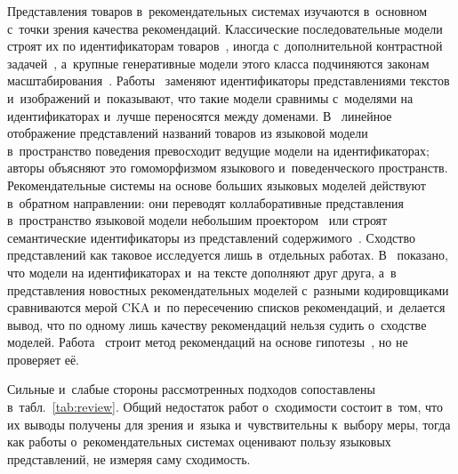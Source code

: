 \documentclass[a4paper,12pt]{article}
\begin{document}
Представления товаров в~рекомендательных системах изучаются в~основном с~точки зрения
качества рекомендаций. Классические последовательные модели строят их по идентификаторам
товаров~\cite{kang2018sasrec,sun2019bert4rec}, иногда с~дополнительной контрастной
задачей~\cite{xie2022cl4srec}, а~крупные генеративные модели этого класса подчиняются
законам масштабирования~\cite{zhai2024hstu}. Работы~\cite{hou2022unisrec,li2023recformer,yuan2023idvsmodality}
заменяют идентификаторы представлениями текстов и~изображений и~показывают, что такие
модели сравнимы с~моделями на идентификаторах и~лучше переносятся между доменами.
В~\cite{sheng2025alpharec} линейное отображение представлений названий товаров
из языковой модели в~пространство поведения превосходит ведущие модели
на идентификаторах; авторы объясняют это гомоморфизмом языкового и~поведенческого
пространств. Рекомендательные системы на основе больших языковых моделей действуют
в~обратном направлении: они переводят коллаборативные представления в~пространство
языковой модели небольшим проектором~\cite{zhang2023collm,liao2024llara} или строят
семантические идентификаторы из представлений содержимого~\cite{rajput2023tiger}.
Сходство представлений как таковое исследуется лишь в~отдельных работах.
В~\cite{collins2025complementarity} показано, что модели на идентификаторах и~на тексте
дополняют друг друга, а~в~\cite{iana2024peeling} представления новостных рекомендательных
моделей с~разными кодировщиками сравниваются мерой CKA и~по пересечению списков
рекомендаций, и~делается вывод, что по одному лишь качеству рекомендаций нельзя судить
о~сходстве моделей. Работа~\cite{lin2024dreamumm} строит метод рекомендаций на основе
гипотезы~\cite{huh2024platonic}, но не проверяет её.

Сильные и~слабые стороны рассмотренных подходов сопоставлены в~табл.~\ref{tab:review}.
Общий недостаток работ о~сходимости состоит в~том, что их выводы получены для зрения
и~языка и~чувствительны к~выбору меры, тогда как работы о~рекомендательных системах
оценивают пользу языковых представлений, не измеряя саму сходимость.
\end{document}
